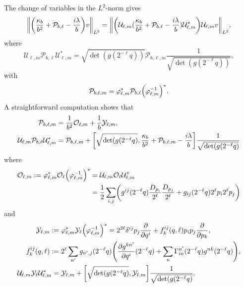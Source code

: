 \documentclass[AHL,Unicode,longabstracts]{cedram}
\newcommand{\clY}{\mathcal{Y}}
\newcommand{\clO}{\mathcal{O}}
\newcommand{\clP}{\mathcal{P}}
\newcommand{\clU}{\mathcal{U}}
\newcommand*{\Mk}{\mkern -2mu}
\newcommand*{\MK}{\mkern 2mu}
\let\originalleft\left
\let\originalright\right
\renewcommand{\left}{\mathopen{}\mathclose\bgroup\originalleft}
\renewcommand{\right}{\aftergroup\egroup\originalright}
\begin{document}
The change of variables in the $L^{2}$-norm gives
\begin{equation}\label{eq:ChangeOfVariableInL2NormAfterNormalCoordinate}
\left\| \left(\frac{\kappa_{b}}{b^{2}}+\clP_{b,\ell}-\frac{i\lambda}{b}\right)v \right\|_{L^2} = \left\|\left(\clU_{\ell,m} (\frac{\kappa_{b}}{b^{2}}+\clP_{b,\ell}-\frac{i\lambda}{b}) \clU_{\ell,m}^*\right) \clU_{\ell,m}v\right\|_{L^2},
\end{equation}
where
\[
\clU_{\ell,m}\clP_{b,\ell} \clU_{\ell,m}^* = \sqrt{\det (g(2^{-\ell}q))} \clP_{b,\ell,m} \frac{1}{\sqrt{\det (g(2^{-\ell}q))}},
\]
with
\[
\clP_{b,\ell,m} = \varphi_{\ell,m}^{*} \clP_{b,\ell} \left(\varphi^{-1}_{\ell,m}\right)^{*}.
\]
A straightforward computation shows that
\begin{align}
\clP_{b,\ell,m} & = \frac{1}{b^{2}}\clO_{\ell,m}+\frac{1}{b}\clY_{\ell,m} ,\label{eq:defPbellm} \\
\clU_{\ell,m} \clP_{b,\ell} \clU_{\ell,m}^* & = \clP_{b,\ell,m} + \left[\sqrt{\det (g(2^{-\ell}q)}, \frac{\kappa_b}{b^2} + \clP_{b,\ell,m} - \frac{i\lambda}{b} \right] \frac{1}{\sqrt{\det (g(2^{-\ell}q)}} \label{eq:ConjugationByUnitary}
\end{align}
where
\begin{equation}\label{eq:defOellm}
\begin{aligned}[t]
\clO_{\ell,m} := \varphi_{\ell,m}^*\clO_{\ell} \left(\varphi_{\ell,m}^{-1}\right)^{*} &= \clU_{\ell,m} \clO_{\ell} \clU_{\ell,m}^*\\ &= \frac{1}{2}
\sum_{i,j}\left(g^{ij}(2^{-\ell}q)\frac{D_{p_{i}}}{2^{\ell}}\frac{D_{p_{j}}}{2^{\ell}} + g_{ij}(2^{-\ell}q)2^{\ell}p_{i}2^{\ell}p_{j}
\right)
\end{aligned}
\end{equation}
and
\begin{align}
\clY_{\ell,m} \,\MK &\!\Mk:= \varphi_{\ell,m}^*\clY_{\ell}\left(\varphi_{\ell,m}^{-1}\right)^*= 2^{2\ell}\delta^{ij}p_{j}\frac{\partial}{\partial q^{i}} + f_{k}^{ij}(q,\ell)p_{i}p_{j}\frac{\partial}{\partial p_{k}} ,\label{eq:defYellm} \\
f_{k}^{ij}(q,\ell) \,\MK &\!\Mk:= 2^{\ell} \sum_{n'}g_{n',j}(2^{-\ell}q)
\left(
\frac{\partial g^{k n'}}{\partial q^{i}}(2^{-\ell }q) + \sum_{n}\Gamma^{n'}_{in}(2^{-\ell} q)g^{n k}(2^{-\ell}q)
\right), \label{formOff}
\\
\clU_{\ell,m}\clY_{\ell} \clU_{\ell,m}^* & = \clY_{\ell,m} + \left[\sqrt{\det (g(2^{-\ell}q)}, \clY_{\ell,m} \right] \frac{1}{\sqrt{\det (g(2^{-\ell }q)}} \label{eq:linkBetweenYlmAndYl}
.
\end{align}
\end{document}
